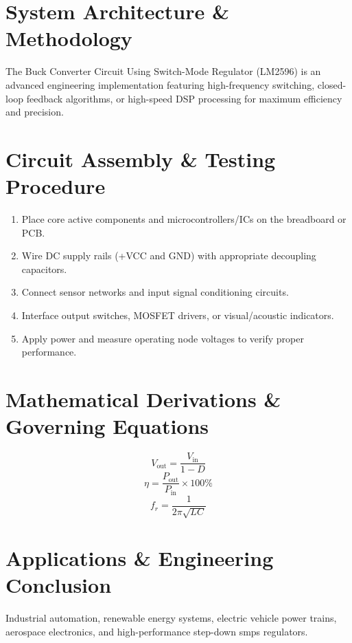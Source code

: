 \documentclass[11pt,a4paper]{article}
\begin{document}
\section{System Architecture \& Methodology}
The Buck Converter Circuit Using Switch-Mode Regulator (LM2596) is an advanced engineering implementation featuring high-frequency switching, closed-loop feedback algorithms, or high-speed DSP processing for maximum efficiency and precision.

\section{Circuit Assembly \& Testing Procedure}
\begin{enumerate}
    \item Place core active components and microcontrollers/ICs on the breadboard or PCB.
    \item Wire DC supply rails (+VCC and GND) with appropriate decoupling capacitors.
    \item Connect sensor networks and input signal conditioning circuits.
    \item Interface output switches, MOSFET drivers, or visual/acoustic indicators.
    \item Apply power and measure operating node voltages to verify proper performance.
\end{enumerate}

\section{Mathematical Derivations \& Governing Equations}
\begin{equation}
V_{\text{out}} = \frac{V_{\text{in}}}{1 - D}
\end{equation}
\begin{equation}
\eta = \frac{P_{\text{out}}}{P_{\text{in}}} \times 100\%
\end{equation}
\begin{equation}
f_r = \frac{1}{2\pi \sqrt{L C}}
\end{equation}

\section{Applications \& Engineering Conclusion}
Industrial automation, renewable energy systems, electric vehicle power trains, aerospace electronics, and high-performance step-down smps regulators.
\end{document}
